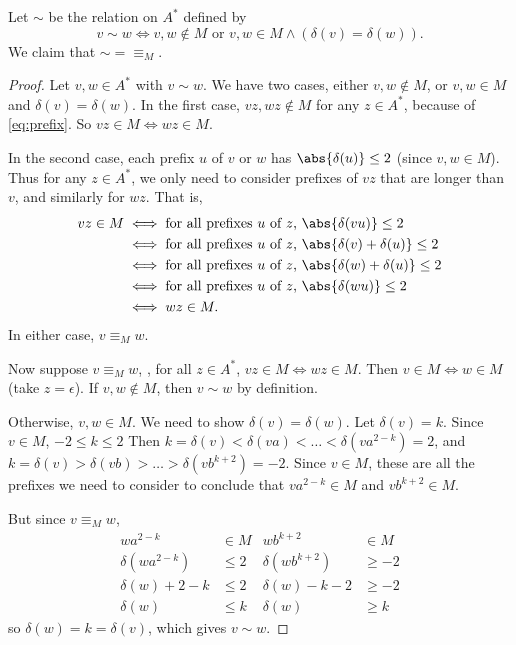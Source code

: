 \documentclass[12pt]{article}
\begin{document}
\begin{solution}
    Let $\sim$ be the relation on $A^*$ defined by \[
        v \sim w \iff v, w \notin M \text{ or }
            v, w \in M \land (\delta(v) = \delta(w)).
    \] We claim that ${\sim} = {\equiv_M}$.
    \begin{proof}
        Let $v, w \in A^*$ with $v \sim w$.
        We have two cases, either $v, w \notin M$,
        or $v, w \in M$ and $\delta(v) = \delta(w)$.
        In the first case, $vz, wz \notin M$ for any $z \in A^*$,
        because of \eqref{eq:prefix}.
        So $vz \in M \iff wz \in M$.

        In the second case, each prefix $u$ of $v$ or $w$ has
        $\abs{\delta(u)} \le 2$ (since $v, w \in M$).
        Thus for any $z \in A^*$, we only need to consider prefixes of $vz$
        that are longer than $v$, and similarly for $wz$.
        That is, \begin{align*}
            vz \in M &\iff \text{for all prefixes $u$ of $z$, }
                \abs{\delta(vu)} \le 2 \\
            &\iff \text{for all prefixes $u$ of $z$, }
                \abs{\delta(v) + \delta(u)} \le 2 \\
            &\iff \text{for all prefixes $u$ of $z$, }
                \abs{\delta(w) + \delta(u)} \le 2 \\
            &\iff \text{for all prefixes $u$ of $z$, }
                \abs{\delta(wu)} \le 2 \\
            &\iff wz \in M.
        \end{align*}
        In either case, $v \equiv_M w$.

        Now suppose $v \equiv_M w$, \ie, for all $z \in A^*$,
        $vz \in M \iff wz \in M$.
        Then $v \in M \iff w \in M$ (take $z = \epsilon$).
        If $v, w \notin M$, then $v \sim w$ by definition.

        Otherwise, $v, w \in M$.
        We need to show $\delta(v) = \delta(w)$.
        Let $\delta(v) = k$.
        Since $v \in M$, $-2 \le k \le 2$
        Then $k = \delta(v) < \delta(va) < \dots < \delta(va^{2-k}) = 2$,
        and $k = \delta(v) > \delta(vb) > \dots > \delta(vb^{k+2}) = -2$.
        Since $v \in M$, these are all the prefixes we need to consider
        to conclude that $va^{2-k} \in M$ and $vb^{k+2} \in M$.

        But since $v \equiv_M w$, \begin{align*}
            wa^{2-k} &\in M & wb^{k+2} &\in M \\
            \delta(wa^{2-k}) &\le 2 & \delta(wb^{k+2}) &\ge -2 \\
            \delta(w) + 2 - k &\le 2 & \delta(w) - k - 2 &\ge -2 \\
            \delta(w) &\le k & \delta(w) &\ge k
        \end{align*} so $\delta(w) = k = \delta(v)$, which gives $v \sim w$.


\end{proof}
\end{solution}
\end{document}
